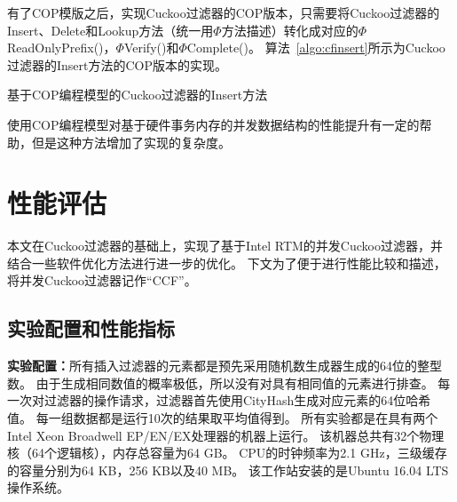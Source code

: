 有了COP模版之后，实现Cuckoo过滤器的COP版本，只需要将Cuckoo过滤器的Insert、Delete和Lookup方法（统一用$\Phi$方法描述）转化成对应的$\Phi$ReadOnlyPrefix()，$\Phi$Verify()和$\Phi$Complete()。
算法~\ref{algo:cfinsert}所示为Cuckoo过滤器的Insert方法的COP版本的实现。

\begin{algorithm}[htbp]
\SetAlgoLined
{}%
%
\caption{基于COP编程模型的Cuckoo过滤器的Insert方法}
\label{algo:cfinsert}
\end{algorithm}

使用COP编程模型对基于硬件事务内存的并发数据结构的性能提升有一定的帮助，但是这种方法增加了实现的复杂度。

\section{性能评估}
本文在Cuckoo过滤器的基础上\cite{fan2014cuckoo}，实现了基于Intel RTM的并发Cuckoo过滤器，并结合一些软件优化方法进行进一步的优化。
下文为了便于进行性能比较和描述，将并发Cuckoo过滤器记作“CCF”。

\subsection{实验配置和性能指标}

\textbf{实验配置：}所有插入过滤器的元素都是预先采用随机数生成器生成的64位的整型数。
由于生成相同数值的概率极低，所以没有对具有相同值的元素进行排查。
每一次对过滤器的操作请求，过滤器首先使用CityHash\cite{cityhash}生成对应元素的64位哈希值。
每一组数据都是运行10次的结果取平均值得到。
所有实验都是在具有两个Intel Xeon Broadwell EP/EN/EX处理器的机器上运行。
该机器总共有32个物理核（64个逻辑核），内存总容量为64 GB。
CPU的时钟频率为2.1 GHz，三级缓存的容量分别为64 KB，256 KB以及40 MB。
该工作站安装的是Ubuntu 16.04 LTS操作系统。

